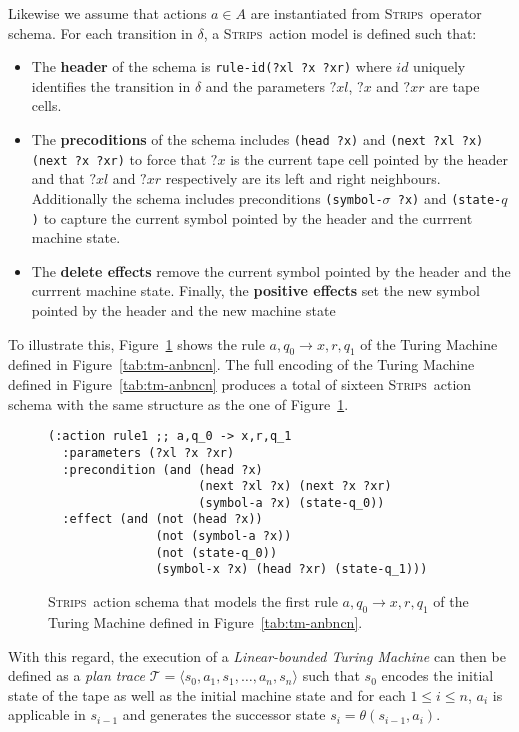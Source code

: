 \documentclass[letterpaper]{article} %
\newcommand{\tup}[1]{{\langle #1 \rangle}}
\newcommand{\strips}{\textsc{Strips}}     %
\begin{document}
Likewise we assume that actions $a\in A$ are instantiated from \strips\ operator schema. For each transition in $\delta$, a \strips\ action model is defined such that:
\begin{itemize}
\item The {\bf header} of the schema is {\tt rule-id(?xl ?x ?xr)} where $id$ uniquely identifies the transition in $\delta$ and the parameters $?xl$, $?x$ and $?xr$ are tape cells.
\item The {\bf precoditions} of the schema includes {\tt(head ?x)} and {\tt (next ?xl ?x) (next ?x ?xr)} to force that $?x$ is the current tape cell pointed by the header and that $?xl$ and $?xr$ respectively are its left and right neighbours. Additionally the schema includes preconditions {\tt(symbol-$\sigma$ ?x)} and {\tt (state-$q$)} to capture the current symbol pointed by the header and the currrent machine state.
\item The {\bf delete effects} remove the current symbol pointed by the header and the currrent machine state. Finally, the {\bf positive effects} set the new symbol pointed by the header and the new machine state 
\end{itemize}

To illustrate this, Figure~\ref{fig:update-rule} shows the rule $a,q_0\rightarrow x,r,q_1$ of the Turing Machine defined in Figure~\ref{tab:tm-anbncn}. The full encoding of the Turing Machine defined in Figure~\ref{tab:tm-anbncn} produces a total of sixteen \strips\ action schema with the same structure as the one of Figure~\ref{fig:update-rule}. 
\begin{figure}[hbt!]
\begin{scriptsize}
\begin{verbatim}
(:action rule1 ;; a,q_0 -> x,r,q_1
  :parameters (?xl ?x ?xr)
  :precondition (and (head ?x) 
                     (next ?xl ?x) (next ?x ?xr) 
                     (symbol-a ?x) (state-q_0))
  :effect (and (not (head ?x)) 
               (not (symbol-a ?x)) 
               (not (state-q_0))
               (symbol-x ?x) (head ?xr) (state-q_1)))
\end{verbatim}
\end{scriptsize}
 \caption{\small \strips\ action schema that models the first rule $a,q_0\rightarrow x,r,q_1$ of the Turing Machine defined in Figure~\ref{tab:tm-anbncn}.}
\label{fig:update-rule}
\end{figure}

With this regard, the execution of a {\em Linear-bounded Turing Machine} can then be defined as a {\em plan trace} $\mathcal{T}=\tup{s_0,a_1,s_1,\ldots,a_n,s_n}$ such that $s_0$ encodes the initial state of the tape as well as the initial machine state and for each {\small $1\leq i\leq n$}, $a_i$ is applicable in $s_{i-1}$ and generates the successor state $s_i=\theta(s_{i-1},a_i)$. 
\end{document}
